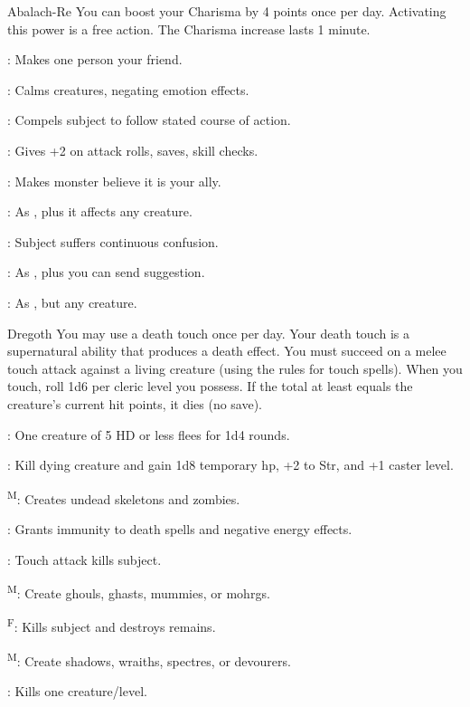 {Abalach-Re}
{You can boost your Charisma by 4 points once per day. Activating this power is a free action. The Charisma increase lasts 1 minute.}
{
	\item {}: Makes one person your friend.
	\item {}: Calms creatures, negating emotion effects.
	\item {}: Compels subject to follow stated course of action.
	\item {}: Gives +2 on attack rolls, saves, skill checks.
	\item {}: Makes monster believe it is your ally.
	\item {}: As , plus it affects any creature.
	\item {}: Subject suffers continuous confusion.
	\item {}: As , plus you can send suggestion.
	\item {}: As , but any creature.
}

{Dregoth}
{You may use a death touch once per day. Your death touch is a supernatural ability that produces a death effect. You must succeed on a melee touch attack against a living creature (using the rules for touch spells). When you touch, roll 1d6 per cleric level you possess. If the total at least equals the creature's current hit points, it dies (no save).}
{
	\item {}: One creature of 5 HD or less flees for 1d4 rounds.
	\item {}: Kill dying creature and gain 1d8 temporary hp, +2 to Str, and +1 caster level.
	\item {}\textsuperscript{M}: Creates undead skeletons and zombies.
	\item {}: Grants immunity to death spells and negative energy effects.
	\item {}: Touch attack kills subject.
	\item {}\textsuperscript{M}: Create ghouls, ghasts, mummies, or mohrgs.
	\item {}\textsuperscript{F}: Kills subject and destroys remains.
	\item {}\textsuperscript{M}: Create shadows, wraiths, spectres, or devourers.
	\item {}: Kills one creature/level.
}

